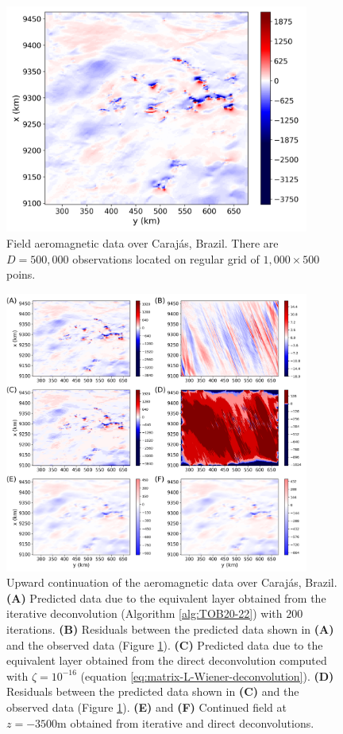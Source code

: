 \begin{figure}[htbp]
	\begin{center}
		\includegraphics[width=10cm]{Fig/carajas_tf_real_data_1000x500}
	\end{center}
	\caption{
		Field aeromagnetic data over Caraj{\'a}s, Brazil. 
		There are $D = 500, 000$ observations located on regular grid of $1,000 \times 500$ poins.
		}
	\label{fig:11}
\end{figure}

\begin{figure}[htbp]
	\begin{center}
		\includegraphics[width=10cm]{Fig/carajas_tf_predito_1000x500}
	\end{center}
	\caption{
		Upward continuation of the aeromagnetic data over Caraj{\'a}s, Brazil.
		\textbf{(A)} Predicted data due to the equivalent layer obtained from the iterative deconvolution 
		(Algorithm \ref{alg:TOB20-22}) with $200$ iterations.
		\textbf{(B)} Residuals between the predicted data shown in \textbf{(A)} and the observed data (Figure \ref{fig:11}). 
		\textbf{(C)} Predicted data due to the equivalent layer obtained from the direct deconvolution computed with $\zeta = 10^{-16}$
		(equation \ref{eq:matrix-L-Wiener-deconvolution}). 
		\textbf{(D)} Residuals between the predicted data shown in \textbf{(C)} and the observed data (Figure \ref{fig:11}). 
		\textbf{(E)} and \textbf{(F)} Continued field at $z = -3500 \mathrm{m}$ obtained from iterative and direct deconvolutions.
		}
	\label{fig:12}
\end{figure}

